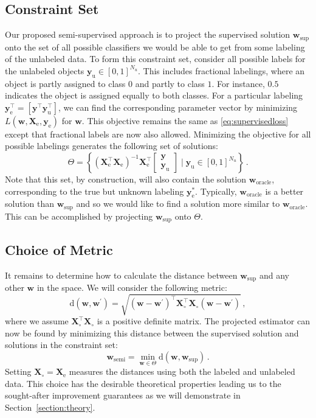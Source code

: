 \documentclass[smallcondensed]{svjour3}\usepackage[]{graphicx}\usepackage[]{color}
\newcommand{\Xe}{\vec{X}_\mathrm{e}  }
\newcommand{\XeT}{\vec{X}_\mathrm{e}^\top}
\newcommand{\ye}{\begin{bmatrix} \vec{y}  \\ \vec{y}_\mathrm{u} \end{bmatrix}}
\newcommand{\G}{\left(\Xe^\top \Xe \right)^{-1}}
\renewcommand{\vec}[1]{\mathbf{#1}}
\begin{document}
\subsection{Constraint Set}
Our proposed semi-supervised approach is to project the supervised solution $\vec{w}_\text{sup}$ onto the set of all possible classifiers we would be able to get from some labeling of the unlabeled data. To form this constraint set, consider all possible labels for the unlabeled objects $\vec{y}_\text{u} \in [0,1]^{N_u}$. This includes fractional labelings, where an object is partly assigned to class $0$ and partly to class $1$. For instance, $0.5$ indicates the object is assigned equally to both classes. For a particular labeling $\vec{y}_\text{e}^\top = \left[ \vec{y}^\top \vec{y}_\text{u}^\top \right]$, we can find the corresponding parameter vector by minimizing $L(\vec{w},\vec{X}_\text{e},\vec{y}_\text{e})$ for $\vec{w}$.
This objective remains the same as \eqref{eq:supervisedloss} except that fractional labels are now also allowed. Minimizing the objective for all possible labelings generates the following set of solutions:
\begin{equation}
\label{eq:constrainedregion}
\Theta=\left\{ \G \XeT \ye \mid \vec{y}_\text{u} \in [0,1]^{N_u} \right\} \, .
\end{equation}
Note that this set, by construction, will also contain the solution $\vec{w}_\text{oracle}$, corresponding to the true but unknown labeling $\vec{y}_\text{e}^{\ast}$. Typically, $\vec{w}_\text{oracle}$ is a better solution than $\vec{w}_\text{sup}$ and so we would like to find a solution more similar to $\vec{w}_\text{oracle}$. This can be accomplished by projecting $\vec{w}_\text{sup}$ onto $\Theta$.

\subsection{Choice of Metric}
It remains to determine how to calculate the distance between $\vec{w}_\text{sup}$ and any other $\vec{w}$ in the space. We will consider the following metric:
\begin{equation}
\label{eq:metric}
\text{d}(\vec{w},\vec{w}^\prime)=\sqrt{\left( \vec{w}-\vec{w}^\prime \right)^\top \vec{X}_{\circ}^\top \vec{X}_{\circ}  \left( \vec{w}-\vec{w}^\prime \right)} \,,
\end{equation}
where we assume $\vec{X}_{\circ}^\top \vec{X}_{\circ}$ is a positive definite matrix. The projected estimator can now be found by minimizing this distance between the supervised solution and solutions in the constraint set:
\begin{equation}
\label{eq:projection}
\vec{w}_\mathrm{semi} = \min_{\vec{w} \in \Theta} \text{d}(\vec{w},\vec{w}_\text{sup}) \,.
\end{equation}
Setting $\vec{X}_\circ=\Xe$ measures the distances using both the labeled and unlabeled data. This choice has the desirable theoretical properties leading us to the sought-after improvement guarantees as we will demonstrate in Section~\ref{section:theory}.
\end{document}
